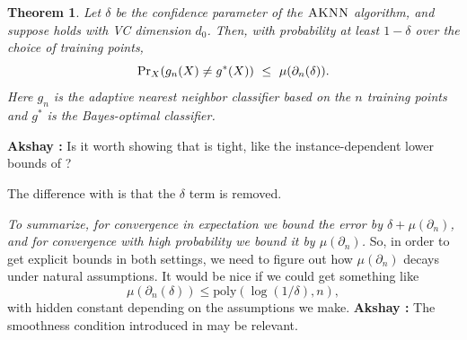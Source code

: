 \documentclass{article}
\def\pr{{\rm Pr}}
\def\X{{\mathcal X}}
\newcommand{\algname}{\textsc{AKNN}}
\newtheorem{theorem}{Theorem}
\newcommand{\comment}[3]{{\color{#1} {\bf #2 :} #3}}
\newcommand{\akshay}[1]{\comment{blue}{Akshay}{#1}}
\begin{document}
\begin{theorem}\label{thm:fastrate2}
Let $\delta$ be the confidence parameter of the $\algname$ algorithm, and suppose  holds with VC dimension $d_0$.
Then, with probability at least $1-\delta$ over the choice of training points,
\[ \pr_{X}(g_n(X) \neq g^*(X)) \ \leq \ \mu(\partial_n (\delta)) .\]
Here $g_n$ is the adaptive nearest neighbor classifier based on the $n$ training points and $g^*$ is the Bayes-optimal classifier. 
\end{theorem}

\akshay{Is it worth showing that  is tight, like the instance-dependent lower bounds of \cite{ChaudhuriDasgupta2014}?}



The difference with  is that the $\delta$ term is removed.

{\it To summarize, for convergence in expectation we bound the error by $\delta + \mu(\partial_n)$,
and for convergence with high probability we bound it by $\mu(\partial_n)$.}
So, in order to get explicit bounds in both settings, we need to figure out how $\mu(\partial_n)$ decays under natural assumptions. It would be nice if we could get something like 
\[\mu(\partial_n (\delta)) \leq \mathrm{poly}\left(\log(1/\delta), n\right),
\]
with hidden constant depending on the assumptions we make.
\akshay{The smoothness condition introduced in \cite{ChaudhuriDasgupta2014} may be relevant.}



\end{document}
